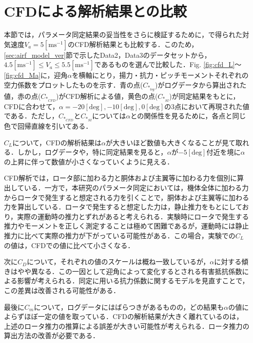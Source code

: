 \section{CFDによる解析結果との比較}
\label{sec:cfd}

本節では，パラメータ同定結果の妥当性をさらに検証するために，\cite{kawano}で得られた対気速度$V_a=5\mathrm{[m s^{-1}]}$のCFD解析結果とも比較する．このため，\ref{sec:airf_model_ver}節で示したData2，Data3のデータセットから，$4.5\mathrm{[m s^{-1}]} \leq V_a \leq 5.5\mathrm{[m s^{-1}]}$であるものを選んで比較した．Fig. \ref{fig:cfd_L}〜\ref{fig:cfd_Ma}に，迎角$\alpha$を横軸にとり，揚力・抗力・ピッチモーメントそれぞれの空力係数をプロットしたものを示す．青の点($C_{*_{log}}$)がログデータから算出された値，赤の点($C_{*_{CFD}}$)がCFD解析による値，黄色の点($C_{*_{SI}}$)が同定結果をもとに，CFDに合わせて，$\alpha=-20\mathrm{[deg]},-10\mathrm{[deg]},0\mathrm{[deg]}$の3点において再現された値である．ただし，$C_{*_{CFD}}$と$C_{*_{SI}}$については$\alpha$との関係性を見るために，各点と同じ色で回帰直線を引いてある．

$C_L$について，CFDの解析結果は$\alpha$が大きいほど数値も大きくなることが見て取れる．しかし，ログデータや，特に同定結果を見ると，$\alpha$が$-5\mathrm{[deg]}$付近を境に$\alpha$の上昇に伴って数値が小さくなっていくように見える．

CFD解析では，ロータ部に加わる力と胴体および主翼等に加わる力を個別に算出している．一方で，本研究のパラメータ同定においては，機体全体に加わる力からロータで発生すると想定される力を引くことで，胴体および主翼等に加わる力を算出している．ロータで発生すると想定した力は，静止推力をもとにしており，実際の運動時の推力とずれがあると考えられる．実験時にロータで発生する推力やモーメントを正しく測定することは極めて困難であるが，運動時には静止推力に比べて実際の推力が下がっている可能性がある．この場合，実験での$C_L$の値は，CFDでの値に比べて小さくなる．

次に$C_D$について，それぞれの値のスケールは概ね一致しているが，$\alpha$に対する傾きはやや異なる．この一因として迎角によって変化するとされる有害抵抗係数による影響が考えられる\cite{katou}．同定に用いる抗力係数に関するモデルを見直すことで，この差異は改善される可能性がある．

最後に$C_m$について，ログデータにはばらつきがあるものの，どの結果も$\alpha$の値によらずほぼ一定の値を取っている．CFDの解析結果が大きく離れているのは，上述のロータ推力の推算による誤差が大きい可能性が考えられる．ロータ推力の算出方法の改善が必要である．

